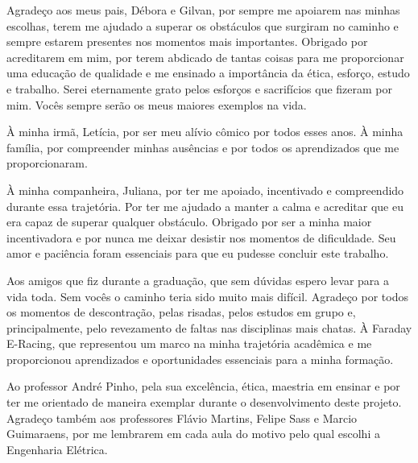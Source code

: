 \begin{agradecimentos}
\sloppy	

Agradeço aos meus pais, Débora e Gilvan, por sempre me apoiarem nas minhas escolhas, terem me ajudado a superar os obstáculos 
que surgiram no caminho e sempre estarem presentes nos momentos mais importantes. Obrigado por acreditarem em mim, por 
terem abdicado de tantas coisas para me proporcionar uma educação de qualidade e me ensinado a importância da ética, esforço, 
estudo e trabalho. Serei eternamente grato pelos esforços e sacrifícios que fizeram por mim. Vocês sempre serão os meus 
maiores exemplos na vida.

À minha irmã, Letícia, por ser meu alívio cômico por todos esses anos. À minha família, por compreender minhas ausências
e por todos os aprendizados que me proporcionaram.

À minha companheira, Juliana, por ter me apoiado, incentivado e compreendido durante essa trajetória. Por ter me 
ajudado a manter a calma e acreditar que eu era capaz de superar qualquer obstáculo. Obrigado por ser a
minha maior incentivadora e por nunca me deixar desistir nos momentos de dificuldade. Seu amor e paciência foram
essenciais para que eu pudesse concluir este trabalho.

Aos amigos que fiz durante a graduação, que sem dúvidas espero levar para a vida toda. Sem vocês o caminho teria sido
muito mais difícil. Agradeço por todos os momentos de descontração, pelas risadas, pelos estudos em grupo e, 
principalmente, pelo revezamento de faltas nas disciplinas mais chatas. À Faraday E-Racing, que representou um marco
na minha trajetória acadêmica e me proporcionou aprendizados e oportunidades essenciais para a minha formação.

Ao professor André Pinho, pela sua excelência, ética, maestria em ensinar e por ter me orientado de maneira exemplar
durante o desenvolvimento deste projeto. Agradeço também aos professores Flávio Martins, Felipe 
Sass e Marcio Guimaraens, por me lembrarem em cada aula do motivo pelo qual escolhi a Engenharia Elétrica. 

\end{agradecimentos}